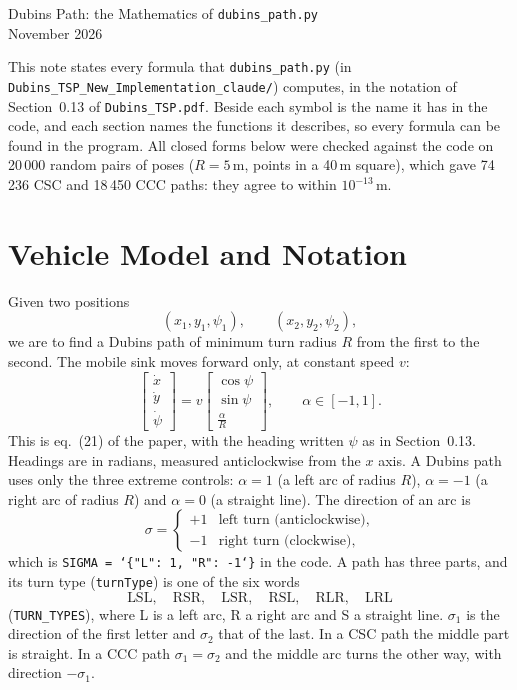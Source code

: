 \documentclass[10pt]{article}
\newcommand{\code}[1]{\texttt{#1}}
\newcommand{\lb}{\char`\{}
\newcommand{\rb}{\char`\}}
\begin{document}
\begin{center}
  {\LARGE Dubins Path: the Mathematics of \code{dubins\_path.py}}\\[1.2em]
  {\large November 2026}
\end{center}
\vspace{1em}

This note states every formula that \code{dubins\_path.py} (in \code{Dubins\_TSP\_New\_Implementation\_claude/})
computes, in the notation of Section~0.13 of \code{Dubins\_TSP.pdf}. Beside each symbol is the name it has in the
code, and each section names the functions it describes, so every formula can be found in the program. All closed
forms below were checked against the code on 20\,000 random pairs of poses ($R = 5$\,m, points in a 40\,m square),
which gave 74\,236 CSC and 18\,450 CCC paths: they agree to within $10^{-13}$\,m.

\section{Vehicle Model and Notation}

Given two positions
\[
  (x_1, y_1, \psi_1), \qquad (x_2, y_2, \psi_2),
\]
we are to find a Dubins path of minimum turn radius $R$ from the first to the second. The mobile sink moves
forward only, at constant speed $v$:
\begin{equation}
  \begin{bmatrix} \dot{x} \\ \dot{y} \\ \dot{\psi} \end{bmatrix}
  = v \begin{bmatrix} \cos\psi \\ \sin\psi \\ \frac{\alpha}{R} \end{bmatrix},
  \qquad \alpha \in [-1, 1].
  \label{eq:kinematics}
\end{equation}
This is eq.~(21) of the paper, with the heading written $\psi$ as in Section~0.13. Headings are in radians,
measured anticlockwise from the $x$ axis. A Dubins path uses only the three extreme controls: $\alpha = 1$ (a left
arc of radius $R$), $\alpha = -1$ (a right arc of radius $R$) and $\alpha = 0$ (a straight line). The direction of
an arc is
\begin{equation}
  \sigma = \begin{cases} +1 & \text{left turn (anticlockwise)},\\ -1 & \text{right turn (clockwise)}, \end{cases}
  \label{eq:sigma}
\end{equation}
which is \code{SIGMA = \lb"L": 1, "R": -1\rb} in the code. A path has three parts, and its turn type
(\code{turnType}) is one of the six words
\[
  \text{LSL}, \quad \text{RSR}, \quad \text{LSR}, \quad \text{RSL}, \quad \text{RLR}, \quad \text{LRL}
\]
(\code{TURN\_TYPES}), where L is a left arc, R a right arc and S a straight line. $\sigma_1$ is the direction of the
first letter and $\sigma_2$ that of the last. In a CSC path the middle part is straight. In a CCC path
$\sigma_1 = \sigma_2$ and the middle arc turns the other way, with direction $-\sigma_1$.
\end{document}
